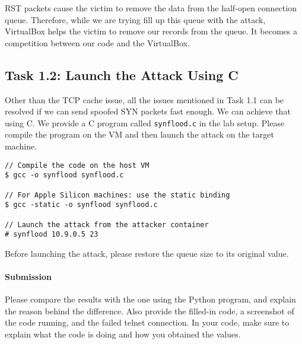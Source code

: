 RST packets cause the victim to remove the data from the half-open connection
queue. Therefore, while we are trying fill up this queue with the attack, 
VirtualBox helps the victim to remove our records from the queue. 
It becomes a competition between our code and the VirtualBox. 


\subsection{Task 1.2: Launch the Attack Using C} 

Other than the TCP cache issue, all the issues mentioned in Task 1.1 
can be resolved if we can send spoofed SYN packets fast enough. We
can achieve that using C. We provide a C program called \texttt{synflood.c}
in the lab setup. Please compile
the program on the VM and then launch the attack on the target machine.

\begin{lstlisting}
// Compile the code on the host VM
$ gcc -o synflood synflood.c

// For Apple Silicon machines: use the static binding
$ gcc -static -o synflood synflood.c

// Launch the attack from the attacker container
# synflood 10.9.0.5 23
\end{lstlisting}


Before launching the attack, please restore the queue size to its 
original value. 

\paragraph{Submission} Please compare the results with the one 
using the Python program, and explain the reason behind the difference. 
Also provide the filled-in code, a screenshot of the code running, and the failed telnet connection.
In your code, make sure to explain what the code is doing and how you obtained the values.






